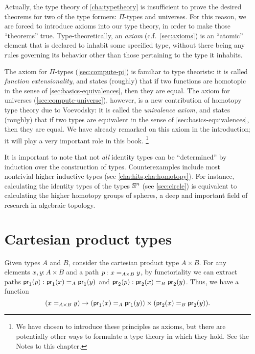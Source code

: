 Actually, the type theory of \autoref{cha:typetheory} is insufficient to prove the desired theorems for two of the type formers: $\Pi$-types and universes.
For this reason, we are forced to introduce axioms into our type theory, in order to make those ``theorems'' true.
Type-theoretically, an \emph{axiom} (c.f.~\autoref{sec:axioms}) is an ``atomic'' element that is declared to inhabit some specified type, without there being any rules governing its behavior other than those pertaining to the type it inhabits.
%

%
%
The axiom for $\Pi$-types (\autoref{sec:compute-pi}) is familiar to type theorists: it is called \emph{function extensionality}, and states (roughly) that if two functions are homotopic in the sense of \autoref{sec:basics-equivalences}, then they are equal.
The axiom for universes (\autoref{sec:compute-universe}), however, is a new contribution of homotopy type theory due to Voevodsky: it is called the \emph{univalence axiom}, and states (roughly) that if two types are equivalent in the sense of \autoref{sec:basics-equivalences}, then they are equal.
We have already remarked on this axiom in the introduction; it will play a very important role in this book.%
\footnote{We have chosen to introduce these principles as axioms, but there are potentially other ways to formulate a type theory in which they hold.
  See the Notes to this chapter.}

It is important to note that not \emph{all} identity types can be ``determined'' by induction over the construction of types.
Counterexamples include most nontrivial higher inductive types (see \autoref{cha:hits,cha:homotopy}).
For instance, calculating the identity types of the types $\Sn^n$ (see \autoref{sec:circle}) is equivalent to calculating the higher homotopy groups of spheres, a deep and important field of research in algebraic topology.


\section{Cartesian product types}
\label{sec:compute-cartprod}

%
Given types $A$ and $B$, consider the cartesian product type $A \times B$.  
For any elements $x,y:A\times B$ and a path $p:\id[A\times B]{x}{y}$, by functoriality we can extract paths $\ap{\proj1}p:\id[A]{\proj1(x)}{\proj1(y)}$ and $\ap{\proj2}p:\id[B]{\proj2(x)}{\proj2(y)}$.
Thus, we have a function
\begin{equation}\label{eq:path-prod}
  (\id[A\times B]{x}{y}) \to (\id[A]{\proj1(x)}{\proj1(y)}) \times (\id[B]{\proj2(x)}{\proj2(y)}).
\end{equation}

